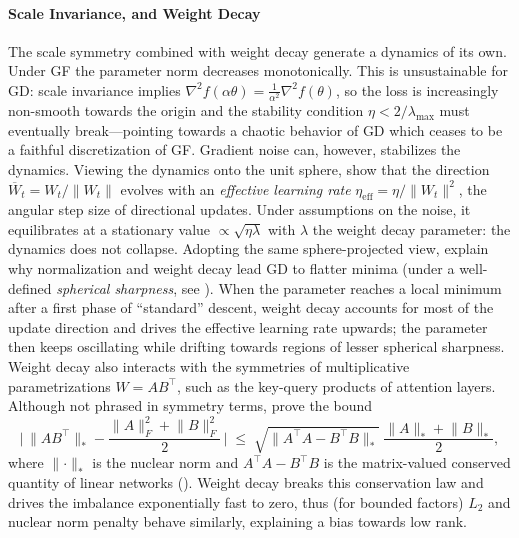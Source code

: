 \documentclass[mathematics,review,submit,moreauthors]{Definitions/mdpi}
\begin{document}
\paragraph{Scale Invariance, and Weight Decay}
The scale symmetry combined with weight decay generate a dynamics of its own.
Under GF the parameter norm decreases monotonically.
This is unsustainable for GD: scale invariance implies $\nabla^2 f(\alpha\theta)=\frac{1}{\alpha^2}\nabla^2 f(\theta)$, so the loss is increasingly non-smooth towards the origin and the stability condition $\eta<2/\lambda_{\mathrm{max}}$ must eventually break---pointing towards a chaotic behavior of GD \citep{li2020anips} which ceases to be a faithful discretization of GF.
Gradient noise can, however, stabilizes the dynamics.
Viewing the dynamics onto the unit sphere, \citet{li2020anips} show that the direction $\overline{W}_t=W_t/\lVert W_t\rVert$ evolves with an \emph{effective learning rate} $\eta_{\mathrm{eff}}=\eta/\lVert W_t\rVert^2$, the angular step size of directional updates.
Under assumptions on the noise, it equilibrates at a stationary value $\propto\sqrt{\eta\lambda}$ with $\lambda$ the weight decay parameter: the dynamics does not collapse.
Adopting the same sphere-projected view, \citet{lyu2023} explain why normalization and weight decay lead GD to flatter minima (under a well-defined \emph{spherical sharpness}, see ).
When the parameter reaches a local minimum after a first phase of ``standard'' descent, weight decay accounts for most of the update direction and drives the effective learning rate upwards; the parameter then keeps oscillating while drifting towards regions of lesser spherical sharpness.
Weight decay also interacts with the symmetries of multiplicative parametrizations $W=AB^{\top}$, such as the key-query products of attention layers.
Although not phrased in symmetry terms, \citet{kobayashi2024anips} prove the bound
\begin{equation*}
    \Big|\, \lVert AB^{\top}\rVert_{*}-\frac{\lVert A\rVert_F^2+\lVert B\rVert_F^2}{2} \,\Big| \;\le\; \sqrt{\lVert A^{\top}A-B^{\top}B\rVert_{*}}\ \frac{\lVert A\rVert_{*}+\lVert B\rVert_{*}}{2},
\end{equation*}
where $\lVert\cdot\rVert_{*}$ is the nuclear norm and $A^{\top}A-B^{\top}B$ is the matrix-valued conserved quantity of linear networks ().
Weight decay breaks this conservation law and drives the imbalance exponentially fast to zero, thus (for bounded factors) $L_2$ and nuclear norm penalty behave similarly, explaining a bias towards low rank.
\end{document}
